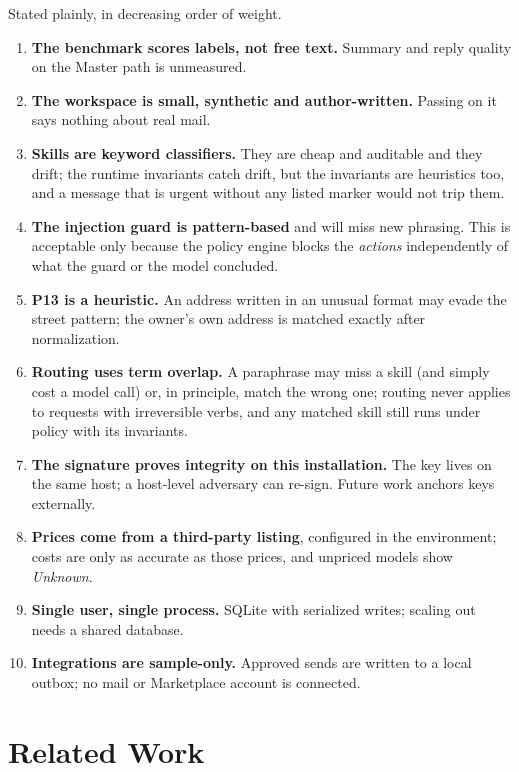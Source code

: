 \documentclass[11pt]{article}
\begin{document}
Stated plainly, in decreasing order of weight.
\begin{enumerate}[leftmargin=*]
\item \textbf{The benchmark scores labels, not free text.} Summary and reply quality on the Master path is unmeasured.
\item \textbf{The workspace is small, synthetic and author-written.} Passing on it says nothing about real mail.
\item \textbf{Skills are keyword classifiers.} They are cheap and auditable and they drift; the runtime invariants catch
drift, but the invariants are heuristics too, and a message that is urgent without any listed marker would not trip them.
\item \textbf{The injection guard is pattern-based} and will miss new phrasing. This is acceptable only because the
policy engine blocks the \emph{actions} independently of what the guard or the model concluded.
\item \textbf{P13 is a heuristic.} An address written in an unusual format may evade the street pattern; the owner's own
address is matched exactly after normalization.
\item \textbf{Routing uses term overlap.} A paraphrase may miss a skill (and simply cost a model call) or, in principle,
match the wrong one; routing never applies to requests with irreversible verbs, and any matched skill still runs
under policy with its invariants.
\item \textbf{The signature proves integrity on this installation.} The key lives on the same host; a host-level
adversary can re-sign. Future work anchors keys externally.
\item \textbf{Prices come from a third-party listing}, configured in the environment; costs are only as accurate as
those prices, and unpriced models show \emph{Unknown}.
\item \textbf{Single user, single process.} SQLite with serialized writes; scaling out needs a shared database.
\item \textbf{Integrations are sample-only.} Approved sends are written to a local outbox; no mail or Marketplace
account is connected.
\end{enumerate}

\section{Related Work}
\end{document}
